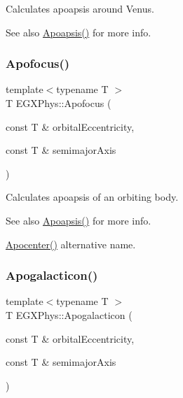 Calculates apoapsis around Venus. 

\begin{DoxySeeAlso}{See also}
\hyperlink{group___e_g_x_phys-_apoapsis_gaf962e650bf84a568458e8eb39b1c61ba}{Apoapsis()} for more info. 
\end{DoxySeeAlso}
\mbox{\label{group___e_g_x_phys-_apoapsis_gaa53ac4e15bc6bc0fecf72eadb7a513e0}} 
\subsubsection{\texorpdfstring{Apofocus()}{Apofocus()}}
{\footnotesize\ttfamily template$<$typename T $>$ \\
T E\+G\+X\+Phys\+::\+Apofocus (\begin{DoxyParamCaption}\item[{const T \&}]{orbital\+Eccentricity,  }\item[{const T \&}]{semimajor\+Axis }\end{DoxyParamCaption})}



Calculates apoapsis of an orbiting body. 

\begin{DoxySeeAlso}{See also}
\hyperlink{group___e_g_x_phys-_apoapsis_gaf962e650bf84a568458e8eb39b1c61ba}{Apoapsis()} for more info. 

\hyperlink{group___e_g_x_phys-_apoapsis_ga5e51a53e2f974264bada34f159fdc948}{Apocenter()} alternative name. 
\end{DoxySeeAlso}
\mbox{\label{group___e_g_x_phys-_apoapsis_ga09b4c7d5e971dc28e1ba37f479958c27}} 
\subsubsection{\texorpdfstring{Apogalacticon()}{Apogalacticon()}}
{\footnotesize\ttfamily template$<$typename T $>$ \\
T E\+G\+X\+Phys\+::\+Apogalacticon (\begin{DoxyParamCaption}\item[{const T \&}]{orbital\+Eccentricity,  }\item[{const T \&}]{semimajor\+Axis }\end{DoxyParamCaption})}



